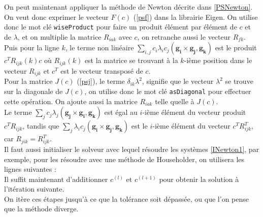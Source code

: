 On peut maintenant appliquer la méthode de Newton décrite dans \ref{PSNewton}. On veut donc exprimer le vecteur $F(c)$ (\ref{psf}) dans la librairie Eigen. On utilise donc le mot clé \texttt{wiseProduct} pour faire un produit élément par élément de $c$ et de $\lambda$, et on multiplie la matrice $R_{iak}$ avec $c$, on retranche aussi le vecteur $R_{fk}$.\\
Puis pour la ligne $k$, le terme non linéaire $\sum_{i,j} c_i\lambda_i c_j (\mathbf{g_i}\times \mathbf{g_j}, \mathbf{g_k})$ est le produit $c^TR_{ijk}(k)c$ où $R_{ijk}(k)$ est la matrice se trouvant à la $k$-ième position dans le vecteur $R_{ijk}$ et $c^T$ est le vecteur transposé de $c$.\\


Pour la matrice $J(c)$ (\ref{psj}), le terme $\delta_{ik}\lambda^2$, signifie que le vecteur $\lambda^2$ se trouve sur la diagonale de $J(c)$, on utilise donc le mot clé \texttt{asDiagonal} pour effectuer cette opération. On ajoute aussi la matrice $R_{iak}$ telle quelle à $J(c)$.\\
Le terme $\sum_j c_j\lambda_j (\mathbf{g_j}\times\mathbf{g_i},\mathbf{g_k})$ est égal au $i$-ième élément du vecteur produit $c^TR_{ijk}$, tandis que $\sum_j\lambda_i c_j (\mathbf{g_i}\times\mathbf{g_j},\mathbf{g_k})$ est le $i$-ième élément du vecteur $c^TR_{ijk}^T$, car $R_{jik}=R_{ijk}^T$.\\


Il faut aussi initialiser le solveur avec lequel résoudre les systèmes \ref{INewton1}, par exemple, pour les résoudre avec une méthode de Householder, on utilisera les lignes suivantes :\\


Il suffit maintenant d'additionner $c^{(l)}$ et $c^{(l+1)}$ pour obtenir la solution à l'itération suivante.\\


On itère ces étapes jusqu'à ce que la tolérance soit dépassée, ou que l'on pense que la méthode diverge.

